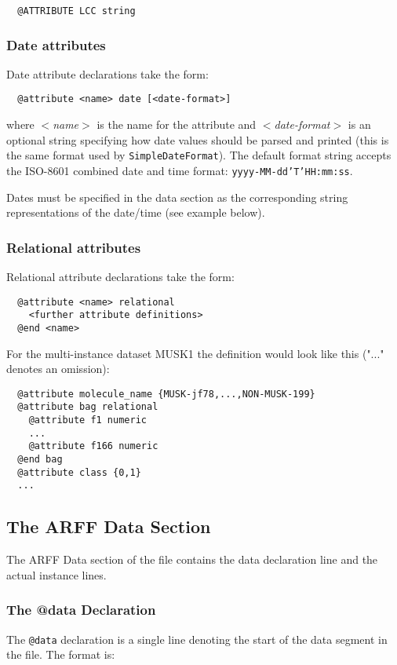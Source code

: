 \begin{verbatim}
  @ATTRIBUTE LCC string
\end{verbatim}


\subsubsection*{Date attributes}
Date attribute declarations take the form:

\begin{verbatim}
  @attribute <name> date [<date-format>]
\end{verbatim}

where \textit{$<$name$>$} is the name for the attribute and \textit{$<$date-format$>$} is an optional string specifying how date values should be parsed and printed (this is the same format used by \texttt{SimpleDateFormat}). The default format string accepts the ISO-8601 combined date and time format: \texttt{yyyy-MM-dd'T'HH:mm:ss}.

Dates must be specified in the data section as the corresponding string representations of the date/time (see example below). 

\subsubsection*{Relational attributes}
Relational attribute declarations take the form:

\begin{verbatim}
  @attribute <name> relational
    <further attribute definitions>
  @end <name>
\end{verbatim}

\noindent For the multi-instance dataset MUSK1 the definition would look like this ("..." denotes an omission):

\begin{verbatim}
  @attribute molecule_name {MUSK-jf78,...,NON-MUSK-199}
  @attribute bag relational
    @attribute f1 numeric
    ...
    @attribute f166 numeric
  @end bag
  @attribute class {0,1}
  ...
\end{verbatim}


\subsection{The ARFF Data Section}
The ARFF Data section of the file contains the data declaration line and the actual instance lines.


\subsubsection*{The @data Declaration}
The \texttt{@data} declaration is a single line denoting the start of the data segment in the file. The format is:

